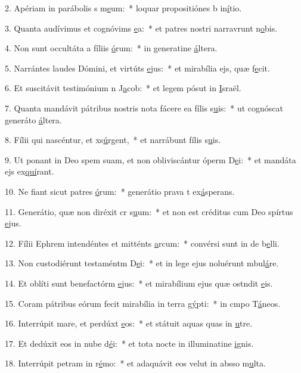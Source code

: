 2. Apériam in parábolis s m\uline{e}um:~* loquar propositiónes b in\uline{í}tio.\par 
3. Quanta audívimus et cognóvims \uline{e}a:~* et patres nostri narravrunt n\uline{o}bis.\par 
4. Non sunt occultáta a fíliis \uline{ó}rum:~* in generatine \uline{á}ltera.\par 
5. Narrántes laudes Dómini, et virtúts \uline{e}jus:~* et mirabília ejs, quæ f\uline{e}cit.\par 
6. Et suscitávit testimónium n J\uline{a}cob:~* et legem pósut in \uline{I}sraël.\par 
7. Quanta mandávit pátribus nostris nota fácere ea fílis s\uline{u}is:~* ut cognóscat generáto \uline{á}ltera.\par 
8. Fílii qui nascéntur, et xs\uline{ú}rgent,~* et narrábunt fílis s\uline{u}is.\par 
9. Ut ponant in Deo spem suam, et non obliviscántur óperm D\uline{e}i:~* et mandáta ejs ex\uline{quí}rant.\par 
10. Ne fiant sicut patres \uline{ó}rum:~* generátio prava t ex\uline{á}sperans.\par 
11. Generátio, quæ non diréxit cr s\uline{u}um:~* et non est créditus cum Deo spírtus \uline{e}jus.\par 
12. Fílii Ephrem intendéntes et mitténts \uline{a}rcum:~* convérsi sunt in de b\uline{e}lli.\par 
13. Non custodiérunt testaméntm D\uline{e}i:~* et in lege ejus noluérunt mbul\uline{á}re.\par 
14. Et oblíti sunt benefactórm \uline{e}jus:~* et mirabílium ejus quæ ostndit \uline{e}is.\par 
15. Coram pátribus eórum fecit mirabília in terra g\uline{ý}pti:~* in cmpo T\uline{á}neos.\par 
16. Interrúpit mare, et perdúxt \uline{e}os:~* et státuit aquas quas in \uline{u}tre.\par 
17. Et dedúxit eos in nube d\uline{é}i:~* et tota nocte in illuminatine \uline{i}gnis.\par 
18. Interrúpit petram in r\uline{é}mo:~* et adaquávit eos velut in absso m\uline{u}lta.\par 
